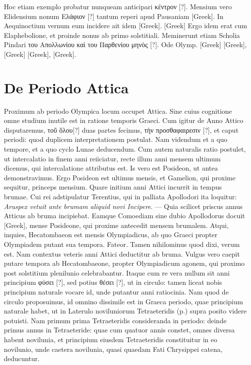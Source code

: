 Hoc etiam exemplo probatur nunqueam anticipari
\textgreek{κέντρον [?]}.
Mensium vero Elidensium nonum \textgreek{Ελάφιον [?]} tantum reperi apud
Pausaniam \textgreek{[Greek]}.
In Aequinoctium
vernum eum incidere ait idem \textgreek{[Greek]}.
\textgreek{[Greek]}
Ergo idem erat cum Elaphebolione, et
proinde nonus ab primo solstitiali.
Meminerunt etiam Scholia Pindari
\textgreek{του Απολλωνίου καὶ του Παρθενίου μηνὸς [?]}.
Ode  Olymp.
\textgreek{[Greek]}
\textgreek{[Greek]}, \textgreek{[Greek]}
\textgreek{[Greek]}, \textgreek{[Greek]}.

\section{De Periodo Attica}

Proximum ab periodo Olympica locum occupet Attica.
Sine
cuius cognitione omne studium inutile est in ratione temporis
Graeci.
Cum igitur de Anno Attico disputaremus, \textgreek{τοῦ ὄλου[?]} duas
partes fecimus, \textgreek{τὴν προσθαφαιρεσιν [?]}, et caput periodi:
 quod duplicem
interpretationem postulat.
Nam videndum et a quo tempore, et a quo
cyclo Lunae deducendum.
Cum autem naturalis ratio postulet, ut intercalatio
in finem anni reiiciatur, recte illum anni mensem ultimum
dicemus, qui intercalatione attributus est.
Is vero est Posideon, ut antea
demonstravimus.
Ergo Posideon est ultimus mensis, et Gamelion,
qui proxime sequitur, princeps mensium.
Quare initium
anni Attici incurrit in tempus brumae.
Cui rei adstipulatur Terentius,
qui in palliata Apollodori ita loquitur: \emph{Aruspex vetuit ante brumam
aliquid novi Incipere}.
--- Quia scilicet priscus annus Atticus
ab bruma incipiebat.
Eamque Comoediam sine dubio Apollodorus
docuit \textgreek{[Greek]}, mense Posideone, qui proxime antecedit
mensem brumalem.
Atqui, inquies, Hecatombaeon est mensis
Olympiadicus, ab quo Graeci propter Olympiadem putant sua
tempora.
Fateor.
Tamen nihilominus quod dixi, verum est.
Nam
contextus veteris anni Attici deductitur ab bruma.
Vulgus vero caepit
putare tempora ab Hecatombaeone, propter Olympiadicum agonem,
qui proximo post solstitium plenilunio celebrabantur.
Itaque cum re
vera nullum sit anni principium \textgreek{φύσει [?]},
 sed potius \textgreek{θέσει [?]}, ut in circulo:
tamen liceat nobis principium naturale vocare id, unde putantur anni
ratiocinia.
Nam quod de circulo proposuimus, id omnino dissimile
est in Graeca periodo, quae principium naturale habet, ut in Laterulo
noviluniorum Tetraeteridis (p.\pageref{tab:p027})
 supra posito videre potuisti.
Nam primum
prima Tetraeteridis consideranda in periodo: deinde primus annus
in Tetraeteride: quae cum quatuor annis constet, omnes diversa
habent novilunia, et principium eiusdem Tetraeteridis constituitur
in eo novilunio, unde caetera novilunia, quasi quaedam Fati Chrysippei
catena, deducuntur.

